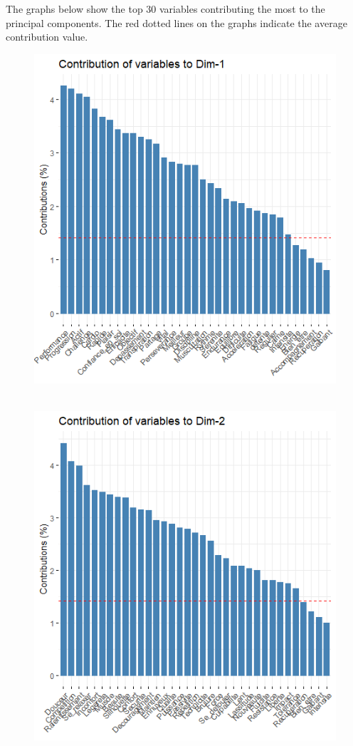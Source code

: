 \documentclass[12pt]{article}
\begin{document}
 The graphs below show the top 30 variables contributing the most to the principal components. 
The red dotted lines on the graphs indicate the average contribution value.

\begin{figure}[H]
\begin{center}
\includegraphics[scale=1.3]{ACP_2.png} 
\caption[]{\ }
\end{center}
\end{figure}


\begin{figure}[H]
\begin{center}
\includegraphics[scale=1.3]{ACP_3.png} 
\caption[]{\ }
\end{center}
\end{figure}
\end{document}

